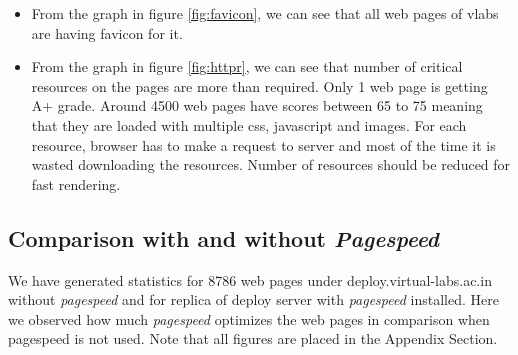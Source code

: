\documentclass[conference]{IEEEtran}
\begin{document}
\begin{itemize}
\item From the graph in figure \ref{fig:favicon}, we can see that all web pages of vlabs are having favicon for it.

\item From the graph in figure \ref{fig:httpr}, we can see that number of critical resources on the pages
are more than required. Only 1 web page is getting A+ grade. Around 4500 web pages
have scores between 65 to 75 meaning that they are loaded with multiple css, javascript
and images. For each resource, browser has to make a request to server and most
of the time it is wasted downloading the resources. Number of resources should be
reduced for fast rendering.
\end{itemize}

\subsection{Comparison with and without {\it Pagespeed}}\label{sec-6.2}
We have generated statistics for 8786 web pages under
deploy.virtual-labs.ac.in without {\it pagespeed} and for replica of deploy server with {\it pagespeed}
installed. Here we observed how much {\it pagespeed} optimizes the web pages in comparison
when pagespeed is not used. Note that all figures are placed in the Appendix Section.
\end{document}
